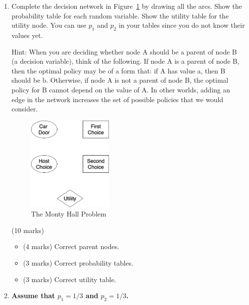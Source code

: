 \documentclass[12pt]{article}
\begin{document}
\begin{enumerate}

\item     
Complete the decision network in Figure~\ref{fig:monty_hall} by drawing all the arcs. Show the probability table for each random variable. Show the utility table for the utility node. You can use $p_1$ and $p_2$ in your tables since you do not know their values yet.

Hint: When you are deciding whether node A should be a parent of node B (a decision variable), think of the following. If node A is a parent of node B, then the optimal policy may be of a form that: if A has value a, then B should be b. Otherwise, if node A is not a parent of node B, the optimal policy for B cannot depend on the value of A. In other worlds, adding an edge in the network increases the set of possible policies that we would consider. 
    
\begin{figure}[ht!]
\centering
\includegraphics[width=0.4\textwidth]{images_posted/a4-dn1-empty.png}
\caption{The Monty Hall Problem}
\label{fig:monty_hall}
\end{figure}
    
\begin{markscheme}

(10 marks)

\begin{itemize}
    \item (4 marks) Correct parent nodes.
    \item (3 marks) Correct probability tables.
    \item (3 marks) Correct utility table.
\end{itemize}

\end{markscheme}


\item

{\bf Assume that $p_1 = 1/3$ and $p_2 = 1/3$.}  


\end{enumerate}
\end{document}
